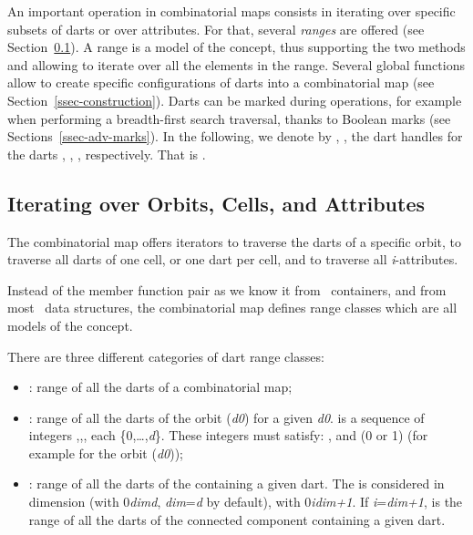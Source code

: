 An important operation in combinatorial maps consists in iterating
over specific subsets of darts or over attributes. For that, several
\emph{ranges} are offered (see Section~\ref{ssec-range}).  A range is
a model of the  concept, thus supporting the two methods
 and  allowing to iterate over all the
elements in the range.  Several global functions allow to create
specific configurations of darts into a combinatorial map (see
Section~\ref{ssec-construction}).  Darts can be marked during
operations, for example when performing a breadth-first search
traversal, thanks to Boolean marks (see
Sections~\ref{ssec-adv-marks}).  In the following, we denote by
, ,  the dart handles for the darts
, , , respectively. That is .

\subsection{Iterating over Orbits, Cells, and Attributes}\label{ssec-range}

The combinatorial map offers iterators to traverse the darts
of a specific orbit, to traverse all darts of one cell, or
one dart per cell, and to traverse all \emph{i}-attributes.

Instead of the  member function pair as we know it
from \stl\ containers, and from most \cgal\ data structures, the
combinatorial map defines range classes which are all models of the
 concept.

There are three different categories of dart range classes:
\begin{itemize}
\item {}: range of all the darts of a combinatorial map;
\item {}: range of all the darts of
  the orbit (\emph{d0}) for a given \emph{d0}.   is a
  sequence of integers 
  ,\myldots{},, 
  each \myin{}\{0,\ldots,\emph{d}\}. 
  These integers must satisfy:
  \mylt{}\mylt{}\myldots{}\mylt{},
  and (\myneq{}0 or \myneq{}1) 
  (for example  for the orbit
  \orbit{\betaun{},\betadeux{}}	(\emph{d0}));	
\item {}: range of all the darts of
  the  containing a given dart. The  is considered in
  dimension  (with 0\myleq{}\emph{dim}\myleq{}\emph{d}, 
  \emph{dim}=\emph{d} by default), 
  with 0\myleq{}\emph{i}\myleq{}\emph{dim+1}. If \emph{i}=\emph{dim+1},
   is the range of all the darts of
  the connected component containing a given dart.
\end{itemize}

